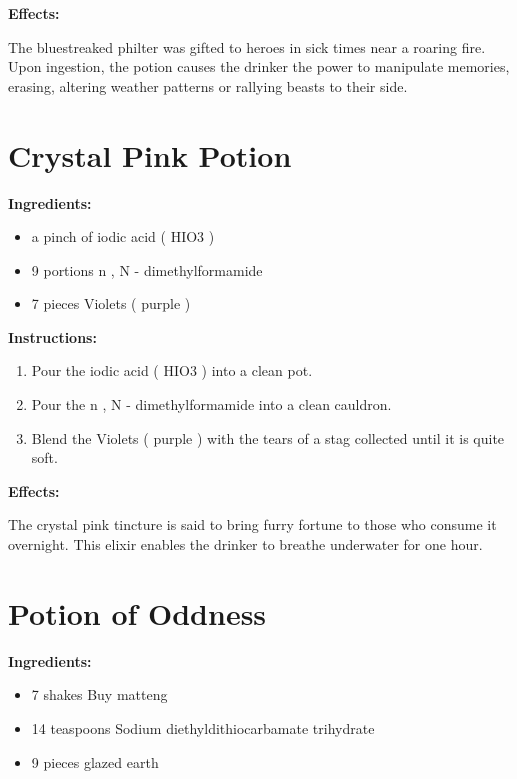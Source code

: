 \documentclass{article}
\begin{document}
\textbf{Effects:}

The bluestreaked philter was gifted to heroes in sick times near a roaring fire. Upon ingestion, the potion causes the drinker the power to manipulate memories, erasing, altering weather patterns or rallying beasts to their side.

\newpage
\section*{Crystal Pink Potion}

\textbf{Ingredients:}

\begin{itemize}
  \item a pinch of iodic acid   ( HIO3 )
  \item 9 portions n , N - dimethylformamide
  \item 7 pieces Violets ( purple )
\end{itemize}

\textbf{Instructions:}

\begin{enumerate}
  \item Pour the iodic acid   ( HIO3 ) into a clean pot.
  \item Pour the n , N - dimethylformamide into a clean cauldron.
  \item Blend the Violets ( purple ) with the tears of a stag collected until it is quite soft.
\end{enumerate}

\textbf{Effects:}

The crystal pink tincture is said to bring furry fortune to those who consume it overnight. This elixir enables the drinker to breathe underwater for one hour.

\newpage
\section*{Potion of Oddness}

\textbf{Ingredients:}

\begin{itemize}
  \item 7 shakes Buy matteng
  \item 14 teaspoons Sodium diethyldithiocarbamate trihydrate
  \item 9 pieces glazed earth
\end{itemize}
\end{document}
